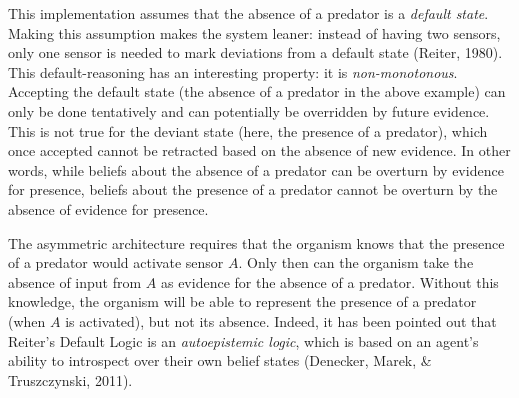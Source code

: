 \documentclass[12pt,twoside]{reedthesis}
\begin{document}
This implementation assumes that the absence of a predator is a \emph{default state}. Making this assumption makes the system leaner: instead of having two sensors, only one sensor is needed to mark deviations from a default state (Reiter, 1980). This default-reasoning has an interesting property: it is \emph{non-monotonous}. Accepting the default state (the absence of a predator in the above example) can only be done tentatively and can potentially be overridden by future evidence. This is not true for the deviant state (here, the presence of a predator), which once accepted cannot be retracted based on the absence of new evidence. In other words, while beliefs about the absence of a predator can be overturn by evidence for presence, beliefs about the presence of a predator cannot be overturn by the absence of evidence for presence.

The asymmetric architecture requires that the organism knows that the presence of a predator would activate sensor \(A\). Only then can the organism take the absence of input from \(A\) as evidence for the absence of a predator. Without this knowledge, the organism will be able to represent the presence of a predator (when \(A\) is activated), but not its absence. Indeed, it has been pointed out that Reiter's Default Logic is an \emph{autoepistemic logic}, which is based on an agent's ability to introspect over their own belief states (Denecker, Marek, \& Truszczynski, 2011).
\end{document}
